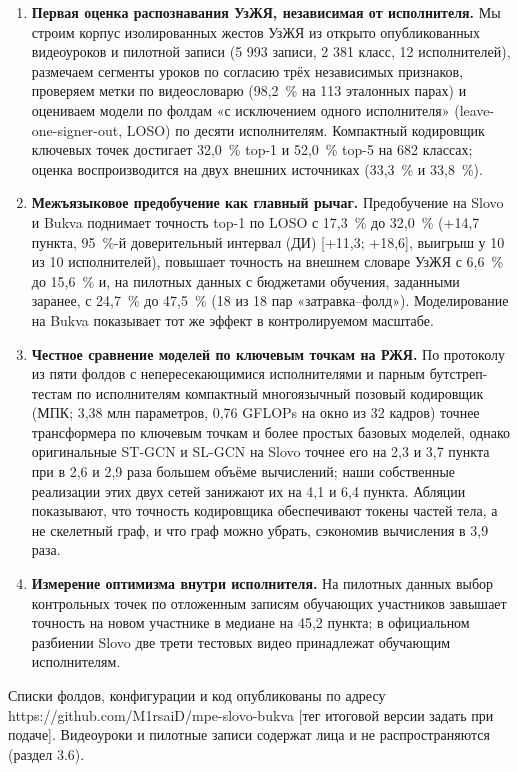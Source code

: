 \documentclass[a4paper,fleqn]{cas-dc}
\providecommand{\tightlist}{\setlength{\itemsep}{0pt}\setlength{\parskip}{0pt}}
\begin{document}
\begin{enumerate}
\def\labelenumi{\arabic{enumi}.}
\tightlist
\item
  \textbf{Первая оценка распознавания УзЖЯ, независимая от исполнителя.} Мы строим корпус изолированных жестов УзЖЯ из открыто опубликованных видеоуроков и пилотной записи (5 993 записи, 2 381 класс, 12 исполнителей), размечаем сегменты уроков по согласию трёх независимых признаков, проверяем метки по видеословарю (98,2~\% на 113 эталонных парах) и оцениваем модели по фолдам «с исключением одного исполнителя» (leave-one-signer-out, LOSO) по десяти исполнителям. Компактный кодировщик ключевых точек достигает 32,0~\% top-1 и 52,0~\% top-5 на 682 классах; оценка воспроизводится на двух внешних источниках (33,3~\% и 33,8~\%).
\item
  \textbf{Межъязыковое предобучение как главный рычаг.} Предобучение на Slovo и Bukva поднимает точность top-1 по LOSO с 17,3~\% до 32,0~\% (+14,7 пункта, 95~\%-й доверительный интервал (ДИ) {[}+11,3; +18,6{]}, выигрыш у 10 из 10 исполнителей), повышает точность на внешнем словаре УзЖЯ с 6,6~\% до 15,6~\% и, на пилотных данных с бюджетами обучения, заданными заранее, с 24,7~\% до 47,5~\% (18 из 18 пар «затравка--фолд»). Моделирование на Bukva показывает тот же эффект в контролируемом масштабе.
\item
  \textbf{Честное сравнение моделей по ключевым точкам на РЖЯ.} По протоколу из пяти фолдов с непересекающимися исполнителями и парным бутстреп-тестам по исполнителям компактный многоязычный позовый кодировщик (МПК; 3,38 млн параметров, 0,76 GFLOPs на окно из 32 кадров) точнее трансформера по ключевым точкам и более простых базовых моделей, однако оригинальные ST-GCN \cite{2018_yan_stgcn} и SL-GCN \cite{2021_jiang_sam_slr} на Slovo точнее его на 2,3 и 3,7 пункта при в 2,6 и 2,9 раза большем объёме вычислений; наши собственные реализации этих двух сетей занижают их на 4,1 и 6,4 пункта. Абляции показывают, что точность кодировщика обеспечивают токены частей тела, а не скелетный граф, и что граф можно убрать, сэкономив вычисления в 3,9 раза.
\item
  \textbf{Измерение оптимизма внутри исполнителя.} На пилотных данных выбор контрольных точек по отложенным записям обучающих участников завышает точность на новом участнике в медиане на 45,2 пункта; в официальном разбиении Slovo две трети тестовых видео принадлежат обучающим исполнителям.
\end{enumerate}

Списки фолдов, конфигурации и код опубликованы по адресу https://github.com/M1rsaiD/mpe-slovo-bukva {\color{red}[тег итоговой версии задать при подаче]}. Видеоуроки и пилотные записи содержат лица и не распространяются (раздел 3.6).
\end{document}
